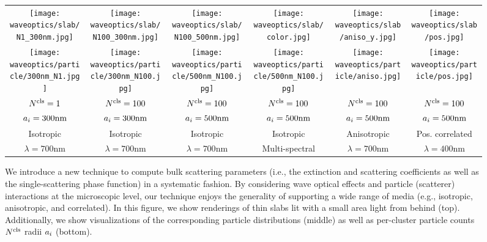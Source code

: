 \begin{figure}[h]
    \centering
    \setlength{\resLen}{1.in}
    \addtolength{\tabcolsep}{-3pt}
    \small
    \begin{tabular}{cccccc}
        \texttt{[image: waveoptics/slab/N1\_300nm.jpg]} &
        \texttt{[image: waveoptics/slab/N100\_300nm.jpg]} &
        \texttt{[image: waveoptics/slab/N100\_500nm.jpg]} &
        \texttt{[image: waveoptics/slab/color.jpg]} & 
        \texttt{[image: waveoptics/slab/aniso\_y.jpg]} &
        \texttt{[image: waveoptics/slab/pos.jpg]}
        \\
        \texttt{[image: waveoptics/particle/300nm\_N1.jpg]} &
        \texttt{[image: waveoptics/particle/300nm\_N100.jpg]} &
        \texttt{[image: waveoptics/particle/500nm\_N100.jpg]} &
        \texttt{[image: waveoptics/particle/500nm\_N100.jpg]} &
        \texttt{[image: waveoptics/particle/aniso.jpg]} &
        \texttt{[image: waveoptics/particle/pos.jpg]}
        \\
        ${N^\text{cls}}=1$   &
        ${N^\text{cls}}=100$ &
        ${N^\text{cls}}=100$ &
        ${N^\text{cls}}=100$ & 
        ${N^\text{cls}}=100$ &
        ${N^\text{cls}}=100$
        \\
        $a_i=300\text{nm}$ &
		$a_i=300\text{nm}$ &
		$a_i=500\text{nm}$ &
		$a_i=500\text{nm}$ & 
		$a_i=500\text{nm}$ &
		$a_i=500\text{nm}$
		\\
        Isotropic & Isotropic & Isotropic & Isotropic & Anisotropic & Pos. correlated
        \\
        $\lambda=700\text{nm}$ &
        $\lambda=700\text{nm}$ &
        $\lambda=700\text{nm}$ &
        Multi-spectral &
        $\lambda=700\text{nm}$ &
        $\lambda=400\text{nm}$
    \end{tabular}
    \caption[Teaser]{\label{fig:waveoptics:teaser}
        We introduce a new technique to compute bulk scattering parameters (i.e., the extinction and scattering coefficients as well as the single-scattering phase function) in a systematic fashion. By considering wave optical effects and particle (scatterer) interactions at the microscopic level, our technique enjoys the generality of supporting a wide range of media (e.g., isotropic, anisotropic, and correlated).
        In this figure, we show renderings of thin slabs lit with a small area light from behind (top).
        Additionally, we show visualizations of the corresponding particle distributions (middle) as well as per-cluster particle counts~${N^\text{cls}}$ radii $a_i$ (bottom).
    }
\end{figure}
